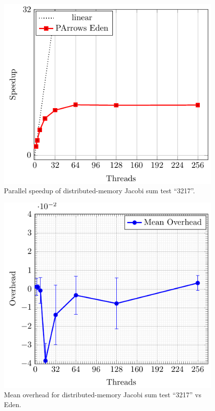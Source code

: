 \documentclass[paper=A4,twoside=true,openright,parskip=full,chapterprefix=true,headings=normal,bibliography=totoc,listof=totoc,titlepage=on,captions=tableabove,draft=false,british]{scrreprt}%
\renewcommand{\enquote}[1]{{``}#1{''}}
\begin{document}
\begin{figure}[h]
\centering
\includegraphics{src/img/perfDistJacobi.pdf}
\caption{Parallel speedup of distributed-memory Jacobi sum test
\enquote{3217}.\label{fig:perfDistJacobi}}
\end{figure}

\begin{figure}[h]
\centering
\includegraphics{src/img/overDistJacobiEden.pdf}
\caption{Mean overhead for distributed-memory Jacobi sum test
\enquote{3217} vs Eden.\label{fig:overDistJacobiEden}}
\end{figure}
\end{document}
